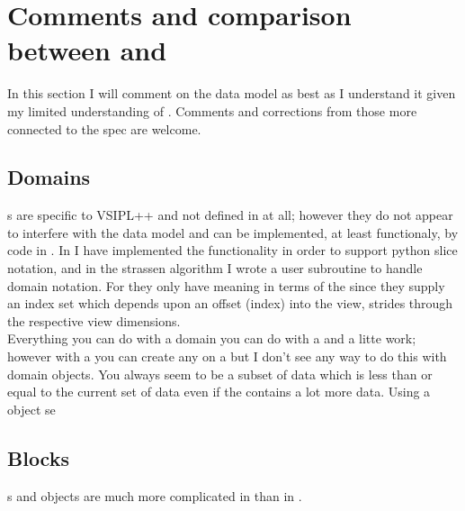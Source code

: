 \section{Comments and comparison between \cvpp{} and \cvl{}}
In this section I will comment on the \cvpp{} data model as best as I understand it given my limited understanding of \cvpp{}.  Comments and corrections from those more connected to the spec are welcome.
\subsection{Domains}
s are specific to VSIPL++ and not defined in \cvl{} at all; however they do not appear to interfere with the \cvl{} data model and can be implemented, at least functionaly, by  code in \cvl{}. In \pyjv{} I have implemented the functionality in order to support python slice notation, and in the strassen algorithm I wrote a user subroutine to handle domain notation.  For \cvl{} they only have meaning in terms of the \vw{} since they supply an index set which depends upon an offset (index) into the view, strides through the respective view dimensions.
\\[6pt]
Everything you can do with a domain you can do with a  and a litte work; however with a  you can create any \vw{} on a \blk{} but I don't see any way to do this with domain objects.  You always seem to be a subset of data which is less than or equal to the current set of data even if the \blk{} contains a lot more data.
Using a  object se 
\subsection{Blocks}
\Blk{}s and \Blk{} objects are much more complicated in \cvpp{} than in \cvl{}. 